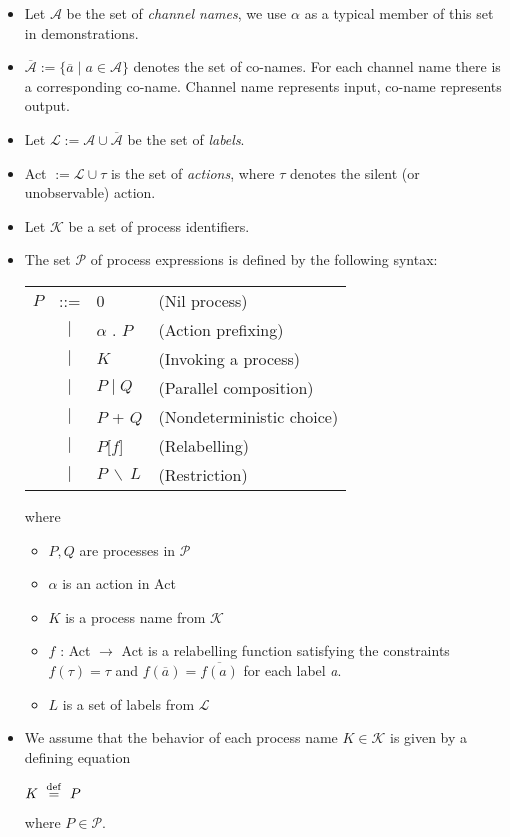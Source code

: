 \begin{itemize}
		\item Let $\mathcal{A}$ be the set of \textit{channel names}, we use 
		$\alpha$ as a typical member of this set in demonstrations.
	
		\item $\overline{\mathcal{A}} := \{\overline{a}\mid a \in \mathcal{A}\}$
		denotes the set of co-names. For each channel name there is a
		corresponding co-name. Channel name represents input, co-name represents 
		output.
	
		\item Let $\mathcal{L} := \mathcal{A} \cup \overline{\mathcal{A}}$ be the 
		set of \textit{labels}.
		
		\item \textsf{Act} $:= \mathcal{L} \cup {\tau}$ is the set of 
		\textit{actions}, where $\tau$ denotes the silent (or unobservable) action.
		
		\item Let $\mathcal{K}$ be a set of process identifiers.
		
		\item The set $\mathcal{P}$ of process expressions is defined by the 
		following syntax:

		\begin{tabular}{r c l l}
			$P$ & ::= & 0 & (Nil process)\\
			    & $\mid$ & $\alpha$ . $P$ & (Action prefixing) \\
			    & $\mid$ & $K$ & (Invoking a process)\\
			    & $\mid$ & $P \mid Q$ & (Parallel composition)\\
			    & $\mid$ & $P$ + $Q$ & (Nondeterministic choice)\\
			    & $\mid$ & $P$[$f$] & (Relabelling)\\
			    & $\mid$ & $P\ \backslash\ L$ & (Restriction)
		\end{tabular}
		
		where 
		
		\begin{itemize}
			\item $P,Q$ are processes in $\mathcal{P}$
			\item $\alpha$ is an action in \textsf{Act}
			\item $K$ is a process name from $\mathcal{K}$
			\item $f$ : \textsf{Act} $\rightarrow$ \textsf{Act} is a relabelling 
			function satisfying the constraints $f(\tau) = \tau$ and 
			$f(\overline{a}) = \overline{f(a)}$ for each label \textit{a}.
			\item $L$ is a set of labels from $\mathcal{L}$
		\end{itemize} 
		
		\item We assume that the behavior of each process name $K \in \mathcal{K}$ 
		is given by a defining equation
		
		\begin{center}$K \ \stackrel{\mathrm{def}}{=}\  P$\end{center}
		
		where $P \in \mathcal{P}$.

	\end{itemize}
